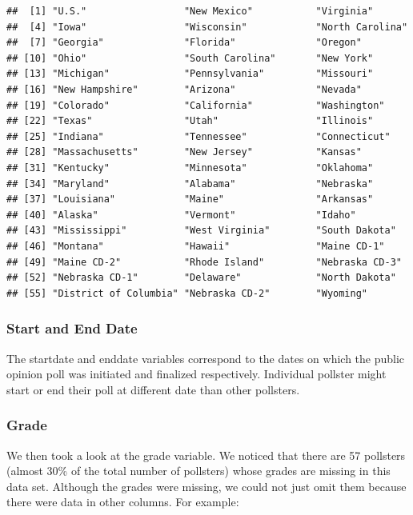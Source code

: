 \documentclass[
  12pt,
]{article}
\begin{document}
\begin{verbatim}
##  [1] "U.S."                 "New Mexico"           "Virginia"            
##  [4] "Iowa"                 "Wisconsin"            "North Carolina"      
##  [7] "Georgia"              "Florida"              "Oregon"              
## [10] "Ohio"                 "South Carolina"       "New York"            
## [13] "Michigan"             "Pennsylvania"         "Missouri"            
## [16] "New Hampshire"        "Arizona"              "Nevada"              
## [19] "Colorado"             "California"           "Washington"          
## [22] "Texas"                "Utah"                 "Illinois"            
## [25] "Indiana"              "Tennessee"            "Connecticut"         
## [28] "Massachusetts"        "New Jersey"           "Kansas"              
## [31] "Kentucky"             "Minnesota"            "Oklahoma"            
## [34] "Maryland"             "Alabama"              "Nebraska"            
## [37] "Louisiana"            "Maine"                "Arkansas"            
## [40] "Alaska"               "Vermont"              "Idaho"               
## [43] "Mississippi"          "West Virginia"        "South Dakota"        
## [46] "Montana"              "Hawaii"               "Maine CD-1"          
## [49] "Maine CD-2"           "Rhode Island"         "Nebraska CD-3"       
## [52] "Nebraska CD-1"        "Delaware"             "North Dakota"        
## [55] "District of Columbia" "Nebraska CD-2"        "Wyoming"
\end{verbatim}

\hypertarget{start-and-end-date}{%
\subsubsection{Start and End Date}\label{start-and-end-date}}

The startdate and enddate variables correspond to the dates on which the
public opinion poll was initiated and finalized respectively. Individual
pollster might start or end their poll at different date than other
pollsters.

\hypertarget{grade}{%
\subsubsection{Grade}\label{grade}}

We then took a look at the grade variable. We noticed that there are 57
pollsters (almost 30\% of the total number of pollsters) whose grades
are missing in this data set. Although the grades were missing, we could
not just omit them because there were data in other columns. For
example:
\end{document}
